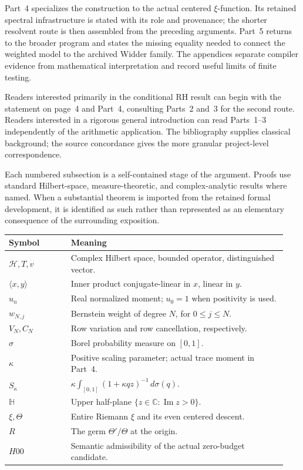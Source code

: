 Part~4 specializes the construction to the actual centered
$\xi$-function. Its retained spectral infrastructure is stated with its
role and provenance; the shorter resolvent route is then assembled
from the preceding arguments. Part~5 returns to the broader program
and states the missing equality needed to connect the weighted model
to the archived Widder family. The appendices separate compiler
evidence from mathematical interpretation and record useful limits of
finite testing.

Readers interested primarily in the conditional RH result can begin
with the statement on page~4 and Part~4, consulting Parts~2 and~3 for
the second route. Readers interested in a rigorous general introduction
can read Parts~1--3 independently of the arithmetic application.
The bibliography supplies classical background; the source concordance
gives the more granular project-level correspondence.

Each numbered subsection is a self-contained stage of the argument.
Proofs use standard Hilbert-space, measure-theoretic, and complex-analytic
results where named. When a substantial theorem is imported from the
retained formal development, it is identified as such rather than
represented as an elementary consequence of the surrounding exposition.

\begin{tabular}{@{}p{0.21\linewidth}p{0.73\linewidth}@{}}
\toprule
Symbol & Meaning\\
\midrule
$\mathcal H,T,v$ & Complex Hilbert space, bounded operator, distinguished vector.\\[4pt]
$\langle x,y\rangle$ & Inner product conjugate-linear in $x$, linear in $y$.\\[4pt]
$u_n$ & Real normalized moment; $u_0=1$ when positivity is used.\\[4pt]
$w_{N,j}$ & Bernstein weight of degree $N$, for $0\le j\le N$.\\[4pt]
$V_N,C_N$ & Row variation and row cancellation, respectively.\\[4pt]
$\sigma$ & Borel probability measure on $[0,1]$.\\[4pt]
$\kappa$ & Positive scaling parameter; actual trace moment in Part~4.\\[4pt]
$S_\kappa$ & $\kappa\int_{[0,1]}(1+\kappa qz)^{-1}\,d\sigma(q)$.\\[4pt]
$\mathbb H$ & Upper half-plane $\{z\in\mathbb C:\operatorname{Im}z>0\}$.\\[4pt]
$\xi,\Theta$ & Entire Riemann $\xi$ and its even centered descent.\\[4pt]
$R$ & The germ $\Theta'/\Theta$ at the origin.\\[4pt]
$H00$ & Semantic admissibility of the actual zero-budget candidate.\\
\bottomrule
\end{tabular}

